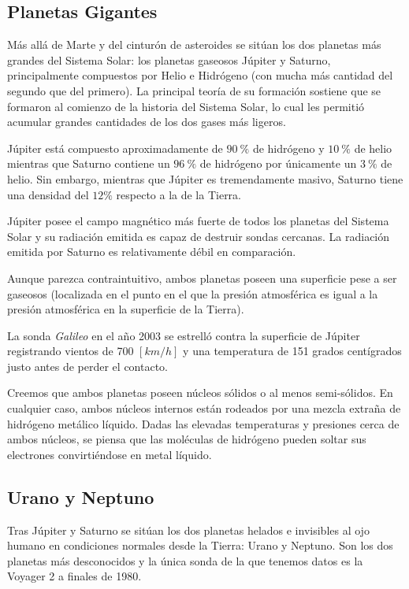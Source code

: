 \documentclass{tufte-handout}
\begin{document}
\subsection{Planetas Gigantes}

Más allá de Marte y del cinturón de asteroides se sitúan los dos planetas más grandes del Sistema Solar: los planetas gaseosos Júpiter y Saturno, principalmente compuestos por Helio e Hidrógeno (con mucha más cantidad del segundo que del primero). La principal teoría de su formación sostiene que se formaron al comienzo de la historia del Sistema Solar, lo cual les permitió acumular grandes cantidades de los dos gases más ligeros.

Júpiter está compuesto aproximadamente de $90~\%$ de hidrógeno y $10~\%$ de helio mientras que Saturno contiene un $96~\%$ de hidrógeno por únicamente un $3~\%$ de helio. Sin embargo, mientras que Júpiter es tremendamente masivo, Saturno tiene una densidad del $12\%$ respecto a la de la Tierra.

Júpiter posee el campo magnético más fuerte de todos los planetas del Sistema Solar y su radiación emitida es capaz de destruir sondas cercanas. La radiación emitida por Saturno es relativamente débil en comparación.

Aunque parezca contraintuitivo, ambos planetas poseen una superficie pese a ser gaseosos (localizada en el punto en el que la presión atmosférica es igual a la presión atmosférica en la superficie de la Tierra).

La sonda \emph{Galileo} en el año 2003 se estrelló contra la superficie de Júpiter registrando vientos de 700 $[km/h]$ y una temperatura de 151 grados centígrados justo antes de perder el contacto.

Creemos que ambos planetas poseen núcleos sólidos o al menos semi-sólidos. En cualquier caso, ambos núcleos internos están rodeados por una mezcla extraña de hidrógeno metálico líquido. Dadas las elevadas temperaturas y presiones cerca de ambos núcleos, se piensa que las moléculas de hidrógeno pueden soltar sus electrones convirtiéndose en metal líquido.

\subsection{Urano y Neptuno}

Tras Júpiter y Saturno se sitúan los dos planetas helados e invisibles al ojo humano en condiciones normales desde la Tierra: Urano y Neptuno. Son los dos planetas más desconocidos y la única sonda de la que tenemos datos es la Voyager 2 a finales de 1980.
\end{document}
